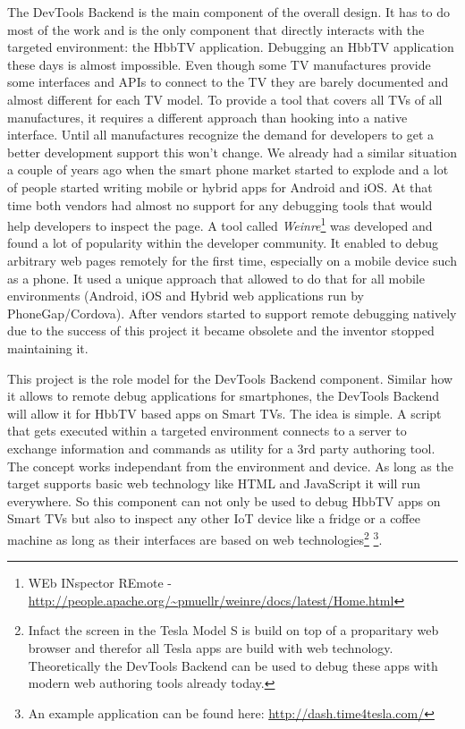 The DevTools Backend is the main component of the overall design. It has to do most of the work
and is the only component that directly interacts with the targeted environment: the HbbTV
application. Debugging an HbbTV application these days is almost impossible. Even though some TV
manufactures provide some interfaces and APIs to connect to the TV they are barely documented and
almost different for each TV model. To provide a tool that covers all TVs of all manufactures, it
requires a different approach than hooking into a native interface. Until all manufactures recognize
the demand for developers to get a better development support this won't change. We already had a
similar situation a couple of years ago when the smart phone market started to explode and a lot of
people started writing mobile or hybrid apps for Android and iOS. At that time both vendors had
almost no support for any debugging tools that would help developers to inspect the page. A tool
called \textit{Weinre}\footnote{WEb INspector REmote - \url{http://people.apache.org/~pmuellr/weinre/docs/latest/Home.html}}
was developed and found a lot of popularity within the developer community. It enabled to debug
arbitrary web pages remotely for the first time, especially on a mobile device such as a phone. It
used a unique approach that allowed to do that for all mobile environments (Android, iOS and Hybrid
web applications run by PhoneGap/Cordova). After vendors started to support remote debugging natively
due to the success of this project it became obsolete and the inventor stopped maintaining it.

This project is the role model for the DevTools Backend component. Similar how it allows to remote
debug applications for smartphones, the DevTools Backend will allow it for HbbTV based apps on Smart
TVs. The idea is simple. A script that gets executed within a targeted environment connects to a
server to exchange information and commands as utility for a 3rd party authoring tool. The concept works
independant from the environment and device. As long as the target supports basic web technology
like HTML and JavaScript it will run everywhere. So this component can not only be used to debug HbbTV
apps on Smart TVs but also to inspect any other IoT device like a fridge or a coffee machine as long
as their interfaces are based on web technologies\footnote{Infact the screen in the Tesla Model S
is build on top of a proparitary web browser and therefor all Tesla apps are build with web
technology. Theoretically the DevTools Backend can be used to debug these apps with modern web
authoring tools already today.} \footnote{An example application can be found here: \url{http://dash.time4tesla.com/}}.

